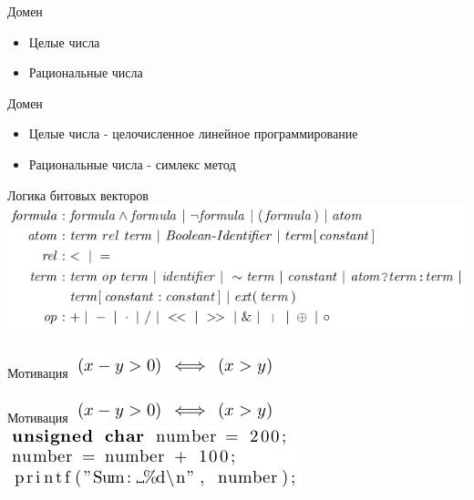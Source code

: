 \documentclass{beamer}
\begin{document}
\begin{frame}{Домен}
\begin{itemize}
\item Целые числа
\item Рациональные числа
\end{itemize}
\end{frame}

\begin{frame}{Домен}
\begin{itemize}
\item Целые числа - целочисленное линейное программирование
\item Рациональные числа - симлекс метод
\end{itemize}
\end{frame}

\begin{frame}{Логика битовых векторов}
\includegraphics[scale=0.5]{bit_syntax.png}
\end{frame}

\begin{frame}{Мотивация}
\includegraphics[scale=0.5]{mot1.png}
\end{frame}

\begin{frame}{Мотивация}
\includegraphics[scale=0.5]{mot1.png}\newline
\includegraphics[scale=0.5]{mot2.png}
\end{frame}
\end{document}
